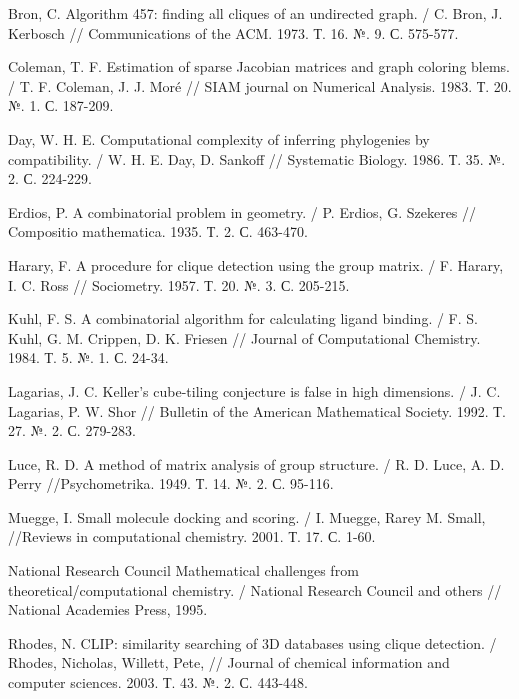 
\newpage
{}

\begin{thebibliography}{9}


 Bron, C. Algorithm 457: finding all cliques of an undirected graph. /
C. Bron, J. Kerbosch // Communications of the ACM. 1973. Т. 16. №. 9. С. 575-577.

 Coleman, T. F. Estimation of sparse Jacobian matrices and graph coloring blems. / T. F. Coleman, J. J. Moré // SIAM journal on Numerical Analysis. 1983. Т. 20. №. 1. С. 187-209.

 Day, W. H. E. Computational complexity of inferring phylogenies by compatibility. / W. H. E. Day, D. Sankoff // Systematic Biology. 1986. Т. 35. №. 2. С. 224-229. 

 Erdios, P. A combinatorial problem in geometry. / P. Erdios, G. Szekeres // Compositio mathematica. 1935. Т. 2. С. 463-470.

 Harary, F. A procedure for clique detection using the group matrix. / F. Harary, I. C. Ross // Sociometry. 1957. Т. 20. №. 3. С. 205-215.

 Kuhl, F. S. A combinatorial algorithm for calculating ligand binding. / F. S. Kuhl, G. M. Crippen, D. K. Friesen // Journal of Computational Chemistry. 1984. Т. 5. №. 1. С. 24-34.

 Lagarias, J. C. Keller’s cube-tiling conjecture is false in high dimensions. / J. C. Lagarias, P. W. Shor // Bulletin of the American Mathematical Society. 1992. Т. 27. №. 2. С. 279-283.

 Luce, R. D. A method of matrix analysis of group structure. / R. D. Luce, A. D. Perry //Psychometrika. 1949. Т. 14. №. 2. С. 95-116.

 Muegge, I. Small molecule docking and scoring. / I. Muegge, Rarey M. Small, //Reviews in computational chemistry. 2001. Т. 17. С. 1-60.

 National Research Council Mathematical challenges from theoretical/computational chemistry. / National Research Council and others // National Academies Press, 1995.

 Rhodes, N.  CLIP: similarity searching of 3D databases using clique detection. / Rhodes, Nicholas, Willett, Pete, // Journal of chemical information and computer sciences. 2003. Т. 43. №. 2. С. 443-448.


\end{thebibliography}
